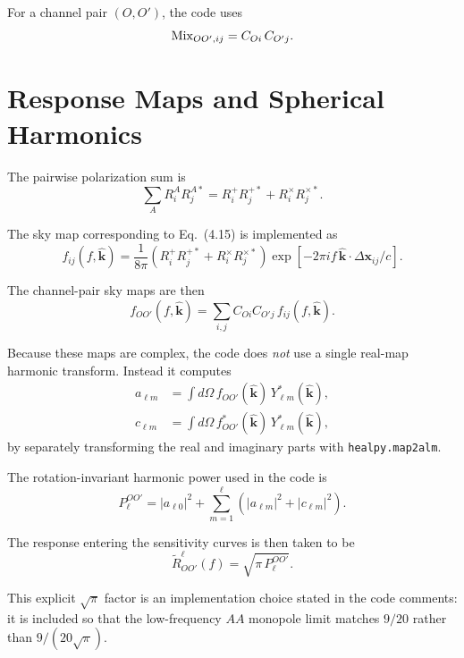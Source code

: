 \documentclass[11pt]{article}
\begin{document}
For a channel pair $(O,O')$, the code uses
\begin{equation}
{\rm Mix}_{OO',ij} = C_{Oi}\,C_{O'j}.
\end{equation}

\section{Response Maps and Spherical Harmonics}
The pairwise polarization sum is
\begin{equation}
\sum_A R_i^A R_j^{A*}
=
R_i^+ R_j^{+*} + R_i^\times R_j^{\times *}.
\end{equation}

The sky map corresponding to Eq.~(4.15) is implemented as
\begin{equation}
f_{ij}(f,\hat{\mathbf{k}})
= \frac{1}{8\pi}
\left(R_i^+ R_j^{+*} + R_i^\times R_j^{\times *}\right)
\exp\!\left[-2\pi i f\,\hat{\mathbf{k}}\cdot \Delta\mathbf{x}_{ij}/c\right].
\end{equation}

The channel-pair sky maps are then
\begin{equation}
f_{OO'}(f,\hat{\mathbf{k}})
= \sum_{i,j} C_{Oi} C_{O'j} \, f_{ij}(f,\hat{\mathbf{k}}).
\end{equation}

Because these maps are complex, the code does \emph{not} use a single real-map harmonic transform. Instead it computes
\begin{align}
a_{\ell m} &= \int d\Omega \, f_{OO'}(\hat{\mathbf{k}})\,Y_{\ell m}^*(\hat{\mathbf{k}}), \\
c_{\ell m} &= \int d\Omega \, f_{OO'}^*(\hat{\mathbf{k}})\,Y_{\ell m}^*(\hat{\mathbf{k}}),
\end{align}
by separately transforming the real and imaginary parts with \texttt{healpy.map2alm}.

The rotation-invariant harmonic power used in the code is
\begin{equation}
P_\ell^{OO'} =
|a_{\ell 0}|^2 + \sum_{m=1}^{\ell}
\left(|a_{\ell m}|^2 + |c_{\ell m}|^2\right).
\end{equation}

The response entering the sensitivity curves is then taken to be
\begin{equation}
\widetilde R_{OO'}^\ell(f) = \sqrt{\pi\,P_\ell^{OO'}}.
\end{equation}

This explicit $\sqrt{\pi}$ factor is an implementation choice stated in the code comments: it is included so that the low-frequency $AA$ monopole limit matches $9/20$ rather than $9/(20\sqrt{\pi})$.
\end{document}
